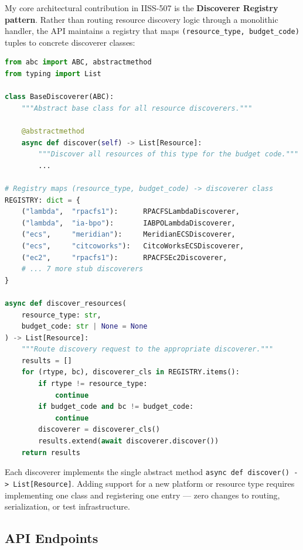 My core architectural contribution in IISS-507 is the
\textbf{Discoverer Registry pattern}. Rather than routing resource
discovery logic through a monolithic handler, the API maintains a
registry that maps \texttt{(resource\_type, budget\_code)} tuples to
concrete discoverer classes:

\begin{lstlisting}[language=Python, caption={Discoverer Registry --- Core Pattern}]
from abc import ABC, abstractmethod
from typing import List

class BaseDiscoverer(ABC):
    """Abstract base class for all resource discoverers."""

    @abstractmethod
    async def discover(self) -> List[Resource]:
        """Discover all resources of this type for the budget code."""
        ...

# Registry maps (resource_type, budget_code) -> discoverer class
REGISTRY: dict = {
    ("lambda",  "rpacfs1"):      RPACFSLambdaDiscoverer,
    ("lambda",  "ia-bpo"):       IABPOLambdaDiscoverer,
    ("ecs",     "meridian"):     MeridianECSDiscoverer,
    ("ecs",     "citcoworks"):   CitcoWorksECSDiscoverer,
    ("ec2",     "rpacfs1"):      RPACFSEc2Discoverer,
    # ... 7 more stub discoverers
}

async def discover_resources(
    resource_type: str,
    budget_code: str | None = None
) -> List[Resource]:
    """Route discovery request to the appropriate discoverer."""
    results = []
    for (rtype, bc), discoverer_cls in REGISTRY.items():
        if rtype != resource_type:
            continue
        if budget_code and bc != budget_code:
            continue
        discoverer = discoverer_cls()
        results.extend(await discoverer.discover())
    return results
\end{lstlisting}

Each discoverer implements the single abstract method
\texttt{async def discover() -> List[Resource]}. Adding support for a
new platform or resource type requires implementing one class and
registering one entry --- zero changes to routing, serialization, or
test infrastructure.

\subsection{API Endpoints}

